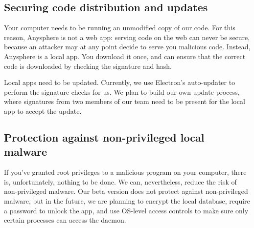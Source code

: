 \subsection{Securing code distribution and updates}

Your computer needs to be running an unmodified copy of our code. For this reason, Anysphere is not a web app: serving code on the web can never be secure, because an attacker may at any point decide to serve you malicious code. Instead, Anysphere is a local app. You download it once, and can ensure that the correct code is downloaded by checking the signature and hash.



Local apps need to be updated. Currently, we use Electron's auto-updater to perform the signature checks for us. We plan to build our own update process, where signatures from two members of our team need to be present for the local app to accept the update. 


\subsection{Protection against non-privileged local malware}

If you've granted root privileges to a malicious program on your computer, there is, unfortunately, nothing to be done. We can, nevertheless, reduce the risk of non-privileged malware. Our beta version does not protect against non-privileged malware, but in the future, we are planning to encrypt the local database, require a password to unlock the app, and use OS-level access controls to make sure only certain processes can access the daemon.

